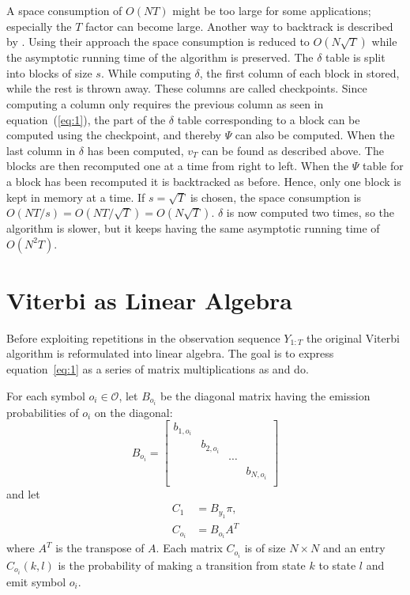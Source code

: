A space consumption of $O(N T)$ might be too large for some applications;
especially the $T$ factor can become large. Another way to backtrack is
described by \citet{Tarnas01061998}. Using their approach the space
consumption is reduced to $O(N \sqrt{T})$ while the asymptotic running time of
the algorithm is preserved. The $\delta$ table is split into blocks of size
$s$. While computing $\delta$, the first column of each block in stored, while
the rest is thrown away. These columns are called checkpoints. Since computing
a column only requires the previous column as seen in equation~(\ref{eq:1}),
the part of the $\delta$ table corresponding to a block can be computed using
the checkpoint, and thereby $\Psi$ can also be computed. When the last column
in $\delta$ has been computed, $v_T$ can be found as described above. The
blocks are then recomputed one at a time from right to left. When the $\Psi$
table for a block has been recomputed it is backtracked as before. Hence, only
one block is kept in memory at a time. If $s = \sqrt{T}$ is chosen, the space
consumption is $O(N T / s) = O(N T / \sqrt{T}) = O(N \sqrt{T})$. $\delta$ is
now computed two times, so the algorithm is slower, but it keeps
having the same asymptotic running time of $O(N^2 T)$.

\section{Viterbi as Linear Algebra}
\label{sec:algorithm-as-linear}

Before exploiting repetitions in the observation sequence $Y_{1:T}$ the
original Viterbi algorithm is reformulated into linear algebra. The goal is to
express equation~\eqref{eq:1} as a series of matrix multiplications as
\citet{sand2013ziphmmlib} and \citet{lifshits2009speeding} do.

For each symbol $o_i \in \mathcal{O}$, let $B_{o_i}$ be the diagonal matrix
having the emission probabilities of $o_i$ on the diagonal:
\begin{equation*}
  B_{o_i} =
  \begin{bmatrix}
    b_{1, o_i} &            &        &            \\
               & b_{2, o_i} &        &            \\
               &            & \cdots &            \\
               &            &        & b_{N, o_i} \\
  \end{bmatrix}
\end{equation*}
and let
\begin{align*}
  C_1          & = B_{y_1} \pi, \\
  C_{o_i}      & = B_{o_i} A^T
\end{align*}
where $A^T$ is the transpose of $A$. Each matrix $C_{o_i}$ is of size $N \times
N$ and an entry $C_{o_i}(k, l)$ is the probability of making a transition
from state $k$ to state $l$ and emit symbol $o_i$.

